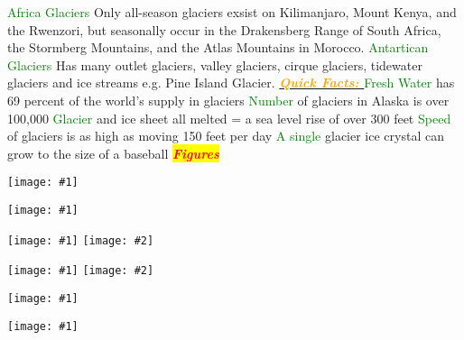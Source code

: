 \documentclass{article}
\newcommand{\red}[1]{\textcolor{red}{#1}}
\newcommand{\green}[1]{\textcolor{green}{#1}}
\newcommand{\orange}[1]{\textcolor{orange}{#1}}
\newcommand{\mysection}[1]{\colorbox{yellow}{\textbf{\textit{\red{#1}}}}}
\newcommand{\mysub}[1]{\underline{\textbf{{\textit{\orange{#1}}}}}}
\newcommand{\mysubsub}[1]{{{\green{#1}}}}
\newcommand{\fig}[1]{
	\texttt{[image: \#1]}
}
\newcommand{\figwidth}[2]{
	\texttt{[image: \#1]}
}
\newcommand{\figtwo}[2]{
	\texttt{[image: \#1]}
	\texttt{[image: \#2]}
}
\begin{document}
\begin{multicols*}{4}
		    \mysubsub{Africa Glaciers} Only all-season glaciers exsist on Kilimanjaro, Mount Kenya, and the Rwenzori, but seasonally occur in the Drakensberg Range of South Africa, the Stormberg Mountains, and the Atlas Mountains in Morocco.
		    \mysubsub{Antartican Glaciers} Has many outlet glaciers, valley glaciers, cirque glaciers, tidewater glaciers and ice streams e.g. Pine Island Glacier. 
		    \mysub{Quick Facts: }
		    \mysubsub{Fresh Water} has 69 percent of the world's supply in glaciers
		    \mysubsub{Number} of glaciers in Alaska is over 100,000
		    \mysubsub{Glacier} and ice sheet all melted = a sea level rise of over 300 feet
		    \mysubsub{Speed} of glaciers is as high as moving 150 feet per day
		    \mysubsub{A single} glacier ice crystal can grow to the size of a baseball
	\mysection{Figures}
	\fig{iceshelf_locations}
	\fig{othersea}
	\figtwo{arctic}{lgm}
	\figtwo{corrie}{milan}
	\fig{seaice}
	\fig{na}


\end{multicols*}
\end{document}
